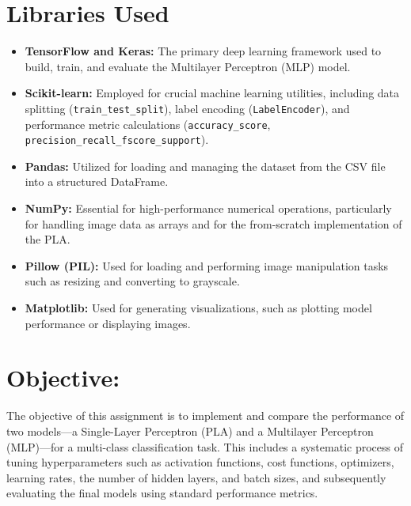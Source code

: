 \documentclass[11pt]{article}
\begin{document}
\vspace{0.4cm}
\noindent
\section{Libraries Used}

\begin{itemize}
    \item \textbf{TensorFlow and Keras:} The primary deep learning framework used to build, train, and evaluate the Multilayer Perceptron (MLP) model.
    \item \textbf{Scikit-learn:} Employed for crucial machine learning utilities, including data splitting (\texttt{train\_test\_split}), label encoding (\texttt{LabelEncoder}), and performance metric calculations (\texttt{accuracy\_score}, \texttt{precision\_recall\_fscore\_support}).
    \item \textbf{Pandas:} Utilized for loading and managing the dataset from the CSV file into a structured DataFrame.
    \item \textbf{NumPy:} Essential for high-performance numerical operations, particularly for handling image data as arrays and for the from-scratch implementation of the PLA.
    \item \textbf{Pillow (PIL):} Used for loading and performing image manipulation tasks such as resizing and converting to grayscale.
    \item \textbf{Matplotlib:} Used for generating visualizations, such as plotting model performance or displaying images.
\end{itemize}

\vspace{0.4cm}
\noindent
\section{Objective:} 
The objective of this assignment is to implement and compare the performance of two models—a Single-Layer Perceptron (PLA) and a Multilayer Perceptron (MLP)—for a multi-class classification task. This includes a systematic process of tuning hyperparameters such as activation functions, cost functions, optimizers, learning rates, the number of hidden layers, and batch sizes, and subsequently evaluating the final models using standard performance metrics.

\vspace{0.4cm}
\end{document}
